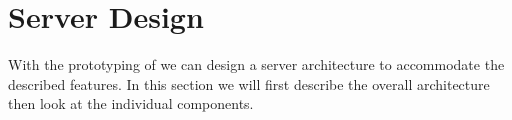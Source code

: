 \section{Server Design}
With the prototyping of  we can design a server architecture to accommodate the described features. In this section we will first describe the overall architecture then look at the individual components.











